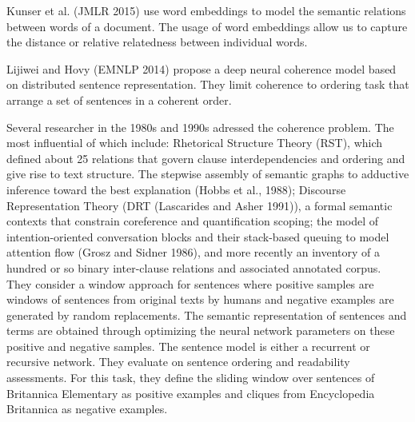 Kunser et al. (JMLR 2015) use word embeddings to model the semantic relations between words of a document. 
The usage of word embeddings allow us to capture the distance or relative relatedness between individual words. 

Lijiwei and Hovy (EMNLP 2014) propose a deep neural coherence model based on distributed sentence representation. 
They limit coherence to ordering task that arrange a set of sentences in a coherent order. 

Several researcher in the 1980s and 1990s adressed the coherence problem. 
The most influential of which include: Rhetorical Structure Theory (RST), which defined about 25 relations that govern clause interdependencies and ordering and give rise to text structure. 
The stepwise assembly of semantic graphs to adductive inference toward the best explanation (Hobbs et al., 1988); Discourse Representation Theory (DRT (Lascarides and Asher 1991)), a formal semantic contexts that constrain coreference and quantification scoping; the model of intention-oriented conversation blocks and their stack-based queuing to model attention flow (Grosz and Sidner 1986), and more recently an inventory of a hundred or so binary inter-clause relations and associated annotated corpus. 
They consider a window approach for sentences where positive samples are windows of sentences from original texts by humans and negative examples are generated by random replacements. 
The semantic representation of sentences and terms are obtained through optimizing the neural network parameters on these positive and negative samples.
The sentence model is either a recurrent or recursive network. 
They evaluate on sentence ordering and readability assessments. 
For this task, they define the sliding window over sentences of Britannica Elementary as positive examples and cliques from Encyclopedia Britannica as negative examples. 

